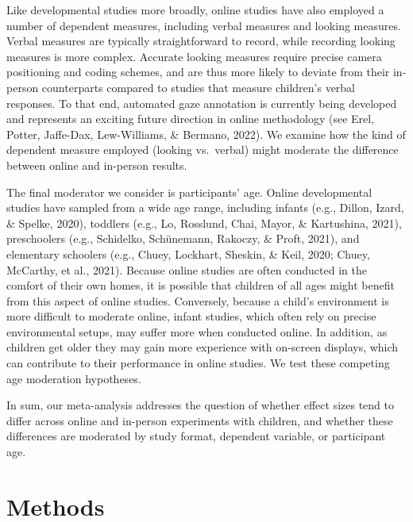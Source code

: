 \documentclass[
  man,floatsintext]{apa6}
\begin{document}
Like developmental studies more broadly, online studies have also employed a number of dependent measures, including verbal measures and looking measures. Verbal measures are typically straightforward to record, while recording looking measures is more complex. Accurate looking measures require precise camera positioning and coding schemes, and are thus more likely to deviate from their in-person counterparts compared to studies that measure children's verbal responses. To that end, automated gaze annotation is currently being developed and represents an exciting future direction in online methodology (see Erel, Potter, Jaffe-Dax, Lew-Williams, \& Bermano, 2022). We examine how the kind of dependent measure employed (looking vs.~verbal) might moderate the difference between online and in-person results.

The final moderator we consider is participants' age. Online developmental studies have sampled from a wide age range, including infants (e.g., Dillon, Izard, \& Spelke, 2020), toddlers (e.g., Lo, Rosslund, Chai, Mayor, \& Kartushina, 2021), preschoolers (e.g., Schidelko, Schünemann, Rakoczy, \& Proft, 2021), and elementary schoolers (e.g., Chuey, Lockhart, Sheskin, \& Keil, 2020; Chuey, McCarthy, et al., 2021). Because online studies are often conducted in the comfort of their own homes, it is possible that children of all ages might benefit from this aspect of online studies. Conversely, because a child's environment is more difficult to moderate online, infant studies, which often rely on precise environmental setups, may suffer more when conducted online. In addition, as children get older they may gain more experience with on-screen displays, which can contribute to their performance in online studies. We test these competing age moderation hypotheses.

In sum, our meta-analysis addresses the question of whether effect sizes tend to differ across online and in-person experiments with children, and whether these differences are moderated by study format, dependent variable, or participant age.

\hypertarget{methods}{%
\section{Methods}\label{methods}}
\end{document}
